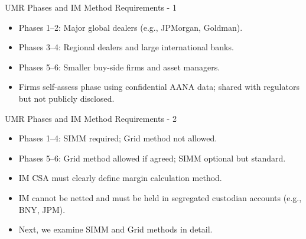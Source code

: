 \documentclass[handout, aspectratio=169]{beamer}
\begin{document}
\begin{frame}{UMR Phases and IM Method Requirements - 1}
  \vspace{1em}
  \begin{itemize}
    \item Phases 1--2: Major global dealers (e.g., JPMorgan, Goldman).
    \item Phases 3--4: Regional dealers and large international banks.
    \item Phases 5--6: Smaller buy-side firms and asset managers.
    \item Firms self-assess phase using confidential AANA data; shared with regulators but not publicly disclosed.
  \end{itemize}
\end{frame}

\begin{frame}{UMR Phases and IM Method Requirements - 2}
  \begin{itemize}
    \item Phases 1--4: SIMM required; Grid method not allowed.
    \item Phases 5--6: Grid method allowed if agreed; SIMM optional but standard.
    \item IM CSA must clearly define margin calculation method.
    \item IM cannot be netted and must be held in segregated custodian accounts (e.g., BNY, JPM).
    \item Next, we examine SIMM and Grid methods in detail.
  \end{itemize}
\end{frame}
  
\end{document}
